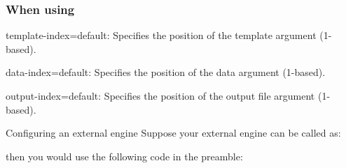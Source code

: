 \subsubsection*{When using }

\begin{docKey}{template-index}{=}{default: }%
  Specifies the position of the template argument (1-based). %
\end{docKey}

\begin{docKey}{data-index}{=}{default: }%
  Specifies the position of the data argument (1-based). %
\end{docKey}

\begin{docKey}{output-index}{=}{default: }%
  Specifies the position of the output file argument (1-based). %
\end{docKey}

\clearpage

\begin{dbexample}{Configuring an external engine}{}
  Suppose your external engine can be called as: %

  
  then you would use the following code in the preamble: %
\begin{preamblecode}
\end{preamblecode}
\end{dbexample}



